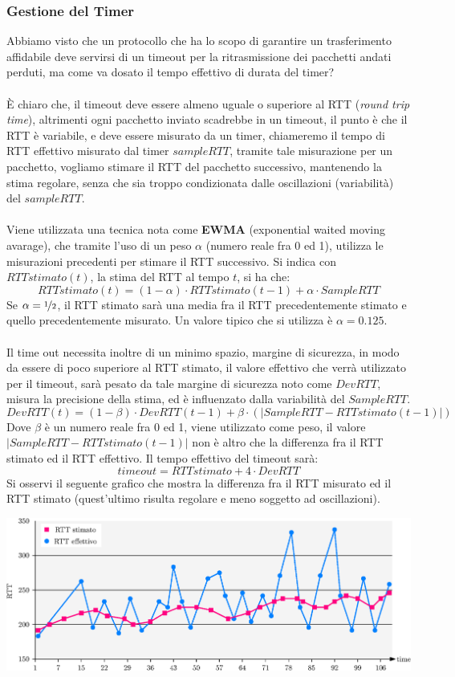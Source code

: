 \documentclass[12pt, letterpaper]{article}
\newcommand{\acc}{\\\hphantom{}\\}
\begin{document}
\subsubsection{Gestione del Timer}
Abbiamo visto che un protocollo che ha lo scopo di garantire un trasferimento affidabile deve servirsi di un timeout
per la ritrasmissione dei pacchetti andati perduti, ma come va dosato il tempo effettivo di durata del timer?\acc
È chiaro che, il timeout deve essere almeno uguale o superiore al RTT (\textit{round trip time}), altrimenti ogni pacchetto
inviato scadrebbe in un timeout, il punto è che il RTT è variabile, e deve essere misurato da un timer, chiameremo
il tempo di RTT effettivo misurato dal timer $sampleRTT$, tramite tale misurazione per un pacchetto,
vogliamo stimare il RTT del pacchetto successivo, mantenendo la stima regolare, senza che sia troppo condizionata dalle
oscillazioni (variabilità) del $sampleRTT$.\acc
Viene utilizzata una tecnica nota come \textbf{EWMA} (exponential waited moving avarage), che tramite l'uso di un
peso $\alpha$ (numero reale fra 0 ed 1), utilizza le misurazioni precedenti per stimare il RTT successivo. Si indica con
$RTTstimato(t)$, la stima del RTT al tempo $t$, si ha che:
$$ RTTstimato(t) = (1-\alpha)\cdot RTTstimato(t-1)+\alpha \cdot SampleRTT$$
Se $\alpha = \nicefrac{1}{2}$, il RTT stimato sarà una media fra il RTT precedentemente stimato e quello
precedentemente misurato. Un valore tipico che si utilizza è $\alpha=0.125$.\acc
Il time out necessita inoltre di un minimo spazio, margine di sicurezza, in modo da essere di poco superiore
al RTT stimato, il valore effettivo che verrà utilizzato per il timeout, sarà pesato da tale margine di sicurezza
noto come $DevRTT$, misura la precisione della stima, ed è influenzato dalla variabilità del $SampleRTT$.
$$ DevRTT(t) = (1-\beta)\cdot DevRTT(t-1) + \beta\cdot(|SampleRTT-RTTstimato(t-1)|) $$
Dove $\beta$ è un numero reale fra 0 ed 1, viene utilizzato come peso, il valore
$|SampleRTT-RTTstimato(t-1)|$ non è altro che la differenza fra il RTT stimato ed il
RTT effettivo. Il tempo effettivo del timeout sarà:
$$ timeout=RTTstimato+4\cdot DevRTT$$
Si osservi il seguente grafico che mostra la differenza fra il RTT misurato ed il RTT stimato (quest'ultimo risulta
regolare e meno soggetto ad oscillazioni).\begin{center}
    \includegraphics[width=\textwidth ]{images/RTTstimato.eps}
\end{center}
\end{document}

